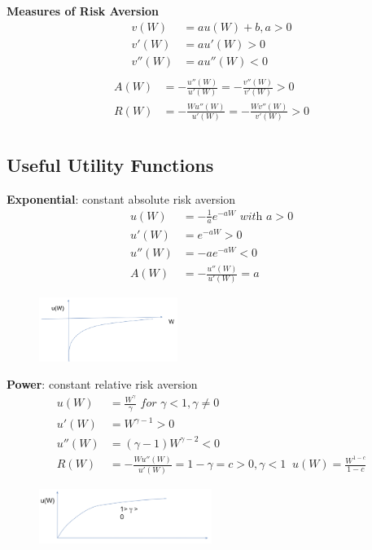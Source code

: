 \documentclass[
14pt,notheorems,hyperref={pdfauthor=whatever}
]{beamer}
\begin{document}
\begin{frame}
\textbf{Measures of Risk Aversion}\\
\hfill \break
\begin{align*}
    v(W)&=au(W)+b, a>0\\
    v'(W)&=au'(W)>0\\
    v''(W)&=au''(W)<0\\
\end{align*}
\begin{align*}
    A(W)&=-\frac{u''(W)}{u'(W)}=-\frac{v''(W)}{v'(W)}>0\\
    R(W)&=-\frac{Wu''(W)}{u'(W)}=-\frac{Wv''(W)}{v'(W)}>0\\
\end{align*}
\end{frame}

\subsection{Useful Utility Functions}
\begin{frame}
\textbf{Exponential}: constant absolute risk aversion\\
\begin{align*}
    u(W)&=-\frac{1}{a}e^{-aW} \textit{ with } a>0\\
    u'(W)&=e^{-aW}>0\\
    u''(W)&=-ae^{-aW}<0\\
    A(W)&=-\frac{u''(W)}{u'(W)} = a
\end{align*}
\begin{figure}[exponential]
    \includegraphics[width=0.4\textwidth]{L1-exp}
    \centering
\end{figure}
\end{frame}

\begin{frame}
\textbf{Power}: constant relative risk aversion\\
\begin{align*}
    u(W)&=\frac{W^\gamma}{\gamma} \textit{ for } \gamma<1, \gamma\neq0\\
    u'(W)&=W^{\gamma-1}>0\\
    u''(W)&=(\gamma-1)W^{\gamma-2}<0\\
    R(W)&=-\frac{Wu''(W)}{u'(W)} = 1-\gamma = c > 0, \gamma < 1 \;\; u(W)=\frac{W^{1-c}}{1-c}
\end{align*}
\begin{figure}[power]
    \includegraphics[width=0.5\textwidth]{L1-power}
    \centering
\end{figure}
\end{frame}
\end{document}
